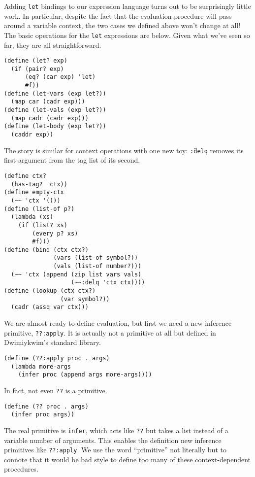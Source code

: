 \documentclass[11pt]{article}
\begin{document}
Adding \texttt{let} bindings to our expression language
turns out to be surprisingly little work.
In particular,
despite the fact that the evaluation procedure
will pass around a variable context,
the two cases we defined above won't change at all!
The basic operations for the \texttt{let} expressions are below.
Given what we've seen so far, they are all straightforward.
\begin{Verbatim}
(define (let? exp)
  (if (pair? exp)
      (eq? (car exp) 'let)
      #f))
(define (let-vars (exp let?))
  (map car (cadr exp)))
(define (let-vals (exp let?))
  (map cadr (cadr exp)))
(define (let-body (exp let?))
  (caddr exp))
\end{Verbatim}
The story is similar for context operations with one new toy:
\texttt{\~\~:delq} removes its first argument from the tag list of its second.
\begin{Verbatim}
(define ctx?
  (has-tag? 'ctx))
(define empty-ctx
  (~~ 'ctx '()))
(define (list-of p?)
  (lambda (xs)
    (if (list? xs)
        (every p? xs)
        #f)))
(define (bind (ctx ctx?)
              (vars (list-of symbol?))
              (vals (list-of number?)))
  (~~ 'ctx (append (zip list vars vals)
                   (~~:delq 'ctx ctx))))
(define (lookup (ctx ctx?)
                (var symbol?))
  (cadr (assq var ctx)))
\end{Verbatim}

We are almost ready to define evaluation,
but first we need a new inference primitive, \texttt{??:apply}.
It is actually not a primitive at all
but defined in Dwimiykwim's standard library.
\begin{Verbatim}
(define (??:apply proc . args)
  (lambda more-args
    (infer proc (append args more-args))))
\end{Verbatim}
In fact, not even \texttt{??} is a primitive.
\begin{Verbatim}
(define (?? proc . args)
  (infer proc args))
\end{Verbatim}
The real primitive is \texttt{infer},
which acts like \texttt{??}
but takes a list instead of a variable number of arguments.
This enables the definition new inference primitives like \texttt{??:apply}.
We use the word ``primitive'' not literally
but to connote that it would be bad style to define too many of these
context-dependent procedures.
\end{document}

